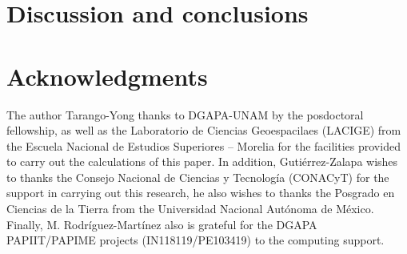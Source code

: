 \documentclass[12pt]{article}
\begin{document}
     

\section{Discussion and conclusions}
\label{sec:discussion}


\section{Acknowledgments}
The author Tarango-Yong thanks to DGAPA-UNAM by the posdoctoral fellowship, as well as the Laboratorio de Ciencias Geoespacilaes (LACIGE) from the Escuela Nacional de Estudios Superiores -- Morelia for the facilities provided to carry out the calculations of this paper. In addition, Guti\'errez-Zalapa wishes to thanks the
Consejo Nacional de Ciencias y Tecnolog\'ia (CONACyT) for the support in carrying out this research, he also wishes to thanks the Posgrado en Ciencias de la Tierra from the Universidad Nacional Aut\'onoma de M\'exico. Finally, M. Rodr\'iguez-Mart\'inez also is grateful for the DGAPA PAPIIT/PAPIME projects (IN118119/PE103419) to the computing support.
%
  


\end{document}
